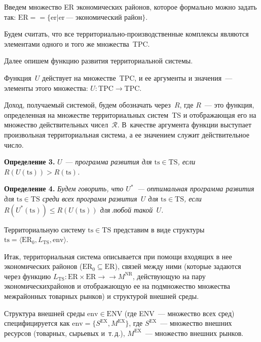\begin{multicols}{2}
  Введем множество ER экономических районов, которое формально можно 
задать так: 
  $\mathrm{ER}=$\linebreak $=\{\mathrm{er} \vert \mathrm{er}~\mbox{---~экономический~район}\}$.
  
  Будем считать, что все территориально-производственные комплексы 
являются элементами одного и того же множества~TPC. 
  
  Далее опишем функцию развития территориальной системы.
  
  Функция~$U$ действует на множестве~TPC, и ее аргументы и значения~--- 
элементы этого множества: $U: \mathrm{TPC}\rightarrow \mathrm{TPC}$. 
  
  Доход, получаемый системой, будем обозначать через~$R$, где $R$~--- это 
функция, определенная на множестве территориальных систем~TS и 
отображающая его на множество действительных чисел~$\mathcal{R}$. 
В~качестве аргумента функции выступает произвольная территориальная 
система, а ее значением служит действительное число.
  
  \medskip
  
  \noindent
  \textbf{Определение 3.} $U$~--- \textit{программа развития для $\mathrm{ts}\in \mathrm{TS}$, 
если $R(U(\mathrm{ts}))>R(\mathrm{ts})$.}
  
  \smallskip
  
  \noindent
  \textbf{Определение 4.} \textit{Будем говорить, что $U^*$~--- оптимальная 
программа развития для $\mathrm{ts}\in \mathrm{TS}$ среди всех программ развития~$U$ для 
$\mathrm{ts}\in \mathrm{TS}$, если $R(U^*(\mathrm{ts}))\leq R(U(\mathrm{ts}))$ для любой такой~$U$.}
  
  \smallskip
  
  Территориальную систему $\mathrm{ts}\in \mathrm{TS}$ представим в виде структуры $\mathrm{ts}=\langle 
\mathrm{ER}_0, L_{\mathrm{TS}}, \mathrm{env}\rangle$.
  
  Итак, территориальная система описывается при помощи входящих в нее 
экономических районов ($\mathrm{ER}_0\subseteq \mathrm{ER}$), связей между ними (которые 
задаются через функцию $L_{\mathrm{TS}}: \mathrm{ER}\times \mathrm{ER}\rightarrow$\linebreak $\rightarrow  M^{\mathrm{NR}}$, 
действующую на пару экономических\linebreak районов и отобра\-жа\-ющую ее на 
подмножество множества межрайонных товарных рынков) и структурой 
внешней среды.
  
  Структура внешней среды $\mathrm{env}\in \mathrm{ENV}$ (где ENV~--- множество всех 
сред) специфицируется как $\mathrm{env}=\{S^{\mathrm{EX}}, M^{\mathrm{EX}}\}$, где $S^{\mathrm{EX}}$~--- 
множество внешних ресурсов (товарных, сырьевых и~т.\,д.), $M^{\mathrm{EX}}$~--- 
множество внешних рынков.
  

\end{multicols}
